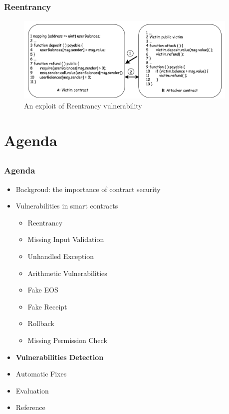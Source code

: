 \documentclass[notheorems, aspectratio=54]{beamer}
\begin{document}
\subsection{}
\begin{frame}
    \frametitle{Reentrancy}

    \begin{figure}[h]
        \centering
        \includegraphics[width=0.95\textwidth]{figures/Reentrancy.png}
        \caption{An exploit of Reentrancy vulnerability}
    \end{figure}

    
\end{frame}


\section{Agenda}
\subsection{}
\begin{frame}
    \frametitle{Agenda}

    \begin{itemize}
        \item Backgroud: the importance of contract security
        \item Vulnerabilities in smart contracts
        \begin{itemize}
            \item Reentrancy
            \item Missing Input Validation
            \item Unhandled Exception
            \item Arithmetic Vulnerabilities
            \item Fake EOS
            \item Fake Receipt
            \item Rollback
            \item Missing Permission Check
        \end{itemize}
        \item \textbf{Vulnerabilities Detection}
        \item Automatic Fixes
        \item Evaluation
        \item Reference
    \end{itemize}
    
\end{frame}
\end{document}
